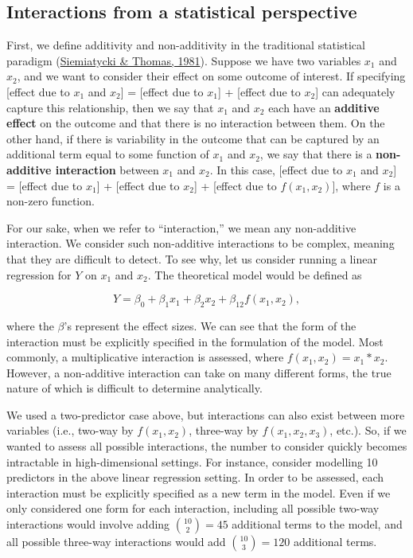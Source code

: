 \documentclass[12pt, twoside]{amherstthesis}
\begin{document}
\hypertarget{interactions-from-a-statistical-perspective}{%
\subsection{Interactions from a statistical perspective}\label{interactions-from-a-statistical-perspective}}

First, we define additivity and non-additivity in the traditional statistical paradigm (\protect\hyperlink{ref-siemiatycki_biological_1981}{Siemiatycki \& Thomas, 1981}). Suppose we have two variables \(x_1\) and \(x_2\), and we want to consider their effect on some outcome of interest. If specifying {[}effect due to \(x_1\) and \(x_2\){]} = {[}effect due to \(x_1\){]} + {[}effect due to \(x_2\){]} can adequately capture this relationship, then we say that \(x_1\) and \(x_2\) each have an \textbf{additive effect} on the outcome and that there is no interaction between them. On the other hand, if there is variability in the outcome that can be captured by an additional term equal to some function of \(x_1\) and \(x_2\), we say that there is a \textbf{non-additive interaction} between \(x_1\) and \(x_2\). In this case, {[}effect due to \(x_1\) and \(x_2\){]} = {[}effect due to \(x_1\){]} + {[}effect due to \(x_2\){]} + {[}effect due to \(f(x_1, x_2)\){]}, where \(f\) is a non-zero function.

For our sake, when we refer to ``interaction,'' we mean any non-additive interaction. We consider such non-additive interactions to be complex, meaning that they are difficult to detect. To see why, let us consider running a linear regression for \(Y\) on \(x_1\) and \(x_2\). The theoretical model would be defined as

\[
Y = \beta_0+\beta_1x_1+\beta_2x_2 + \beta_{12}f(x_1, x_2),
\]

\noindent where the \(\beta\)'s represent the effect sizes. We can see that the form of the interaction must be explicitly specified in the formulation of the model. Most commonly, a multiplicative interaction is assessed, where \(f(x_1, x_2) = x_1*x_2\). However, a non-additive interaction can take on many different forms, the true nature of which is difficult to determine analytically.

We used a two-predictor case above, but interactions can also exist between more variables (i.e., two-way by \(f(x_1, x_2)\), three-way by \(f(x_1, x_2, x_3)\), etc.). So, if we wanted to assess all possible interactions, the number to consider quickly becomes intractable in high-dimensional settings. For instance, consider modelling 10 predictors in the above linear regression setting. In order to be assessed, each interaction must be explicitly specified as a new term in the model. Even if we only considered one form for each interaction, including all possible two-way interactions would involve adding \(\binom{10}{2} = 45\) additional terms to the model, and all possible three-way interactions would add \(\binom{10}{3} = 120\) additional terms.
\end{document}
